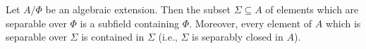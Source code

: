 Let $A/\Phi$ be an algebraic extension. Then the subset $\Sigma \subseteq A$ of elements which are separable over $\Phi$ is a subfield containing $\Phi$. Moreover, every element of $A$ which is separable over $\Sigma$ is contained in $\Sigma$ (i.e., $\Sigma$ is separably closed in $A$).
